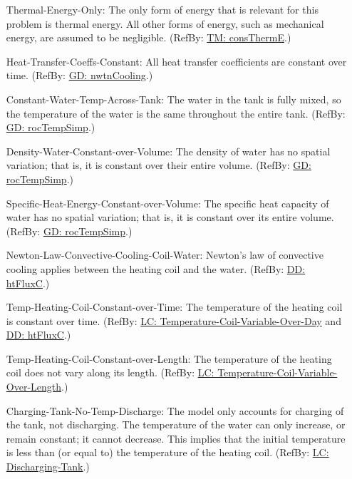 \documentclass[12pt]{article}
\begin{document}
\begin{itemize}
\item[Thermal-Energy-Only:\phantomsection\label{assumpTEO}]The only form of energy that is relevant for this problem is thermal energy. All other forms of energy, such as mechanical energy, are assumed to be negligible. (RefBy: \hyperref[TM:consThermE]{TM: consThermE}.)
\item[Heat-Transfer-Coeffs-Constant:\phantomsection\label{assumpHTCC}]All heat transfer coefficients are constant over time. (RefBy: \hyperref[GD:nwtnCooling]{GD: nwtnCooling}.)
\item[Constant-Water-Temp-Across-Tank:\phantomsection\label{assumpCWTAT}]The water in the tank is fully mixed, so the temperature of the water is the same throughout the entire tank. (RefBy: \hyperref[GD:rocTempSimp]{GD: rocTempSimp}.)
\item[Density-Water-Constant-over-Volume:\phantomsection\label{assumpDWCoW}]The density of water has no spatial variation; that is, it is constant over their entire volume. (RefBy: \hyperref[GD:rocTempSimp]{GD: rocTempSimp}.)
\item[Specific-Heat-Energy-Constant-over-Volume:\phantomsection\label{assumpSHECoW}]The specific heat capacity of water has no spatial variation; that is, it is constant over its entire volume. (RefBy: \hyperref[GD:rocTempSimp]{GD: rocTempSimp}.)
\item[Newton-Law-Convective-Cooling-Coil-Water:\phantomsection\label{assumpLCCCW}]Newton's law of convective cooling applies between the heating coil and the water. (RefBy: \hyperref[DD:htFluxC]{DD: htFluxC}.)
\item[Temp-Heating-Coil-Constant-over-Time:\phantomsection\label{assumpTHCCoT}]The temperature of the heating coil is constant over time. (RefBy: \hyperref[likeChgTCVOD]{LC: Temperature-Coil-Variable-Over-Day} and \hyperref[DD:htFluxC]{DD: htFluxC}.)
\item[Temp-Heating-Coil-Constant-over-Length:\phantomsection\label{assumpTHCCoL}]The temperature of the heating coil does not vary along its length. (RefBy: \hyperref[likeChgTCVOL]{LC: Temperature-Coil-Variable-Over-Length}.)
\item[Charging-Tank-No-Temp-Discharge:\phantomsection\label{assumpCTNTD}]The model only accounts for charging of the tank, not discharging. The temperature of the water can only increase, or remain constant; it cannot decrease. This implies that the initial temperature is less than (or equal to) the temperature of the heating coil. (RefBy: \hyperref[likeChgDT]{LC: Discharging-Tank}.)

\end{itemize}
\end{document}
